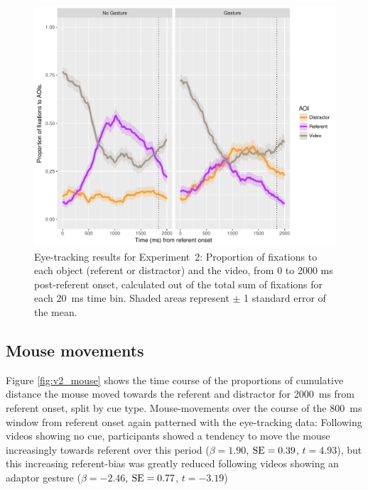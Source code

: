 \documentclass[a4paper,man,natbib]{apa6}
\newcommand{\resultsLM}[3]{$\beta = #1$, $\textnormal{SE} = #2$, $t #3$}
\begin{document}
\begin{figure}[Ht]
  \centering
	\includegraphics[width=\linewidth]{./img/e8_fixations.pdf}
  \caption{Eye-tracking results for Experiment~2: Proportion of fixations to each object (referent or distractor) and the video, from 0 to 2000 ms post-referent onset, calculated out of the total sum of fixations for each 20~ms time bin. Shaded areas represent $\pm$ 1 standard error of the mean.}
  \label{fig:v2_eye}
\end{figure}

\subsection{Mouse movements}
Figure \ref{fig:v2_mouse} shows the time course of the proportions of cumulative distance the mouse moved towards the referent and distractor for 2000~ms from referent onset, split by cue type.
Mouse-movements over the course of the 800~ms window from referent onset again patterned with the eye-tracking data:
Following videos showing no cue, participants showed a tendency to move the mouse increasingly towards referent over this period (\resultsLM{1.90}{0.39}{=4.93}), but this increasing referent-bias was greatly reduced following videos showing an adaptor gesture (\resultsLM{-2.46}{0.77}{=-3.19})
\end{document}
